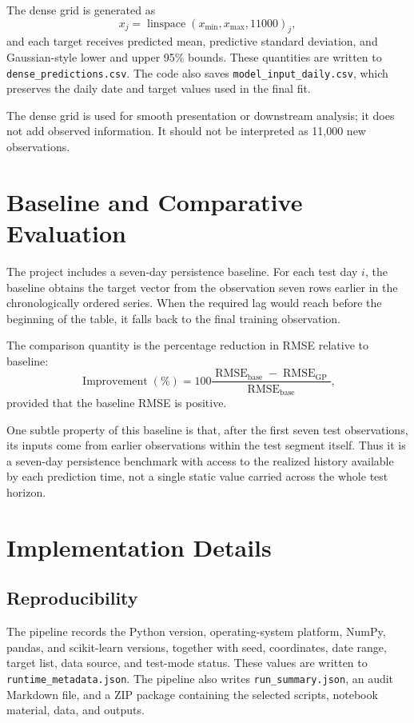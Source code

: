 \documentclass[11pt,a4paper]{article}
\newcommand{\code}[1]{\texttt{#1}}
\begin{document}
The dense grid is generated as
\begin{equation}
 x_j = \operatorname{linspace}(x_{\min},x_{\max},11000)_j,
\end{equation}
and each target receives predicted mean, predictive standard deviation, and Gaussian-style lower and upper 95\% bounds. These quantities are written to \code{dense\_predictions.csv}. The code also saves \code{model\_input\_daily.csv}, which preserves the daily date and target values used in the final fit.

The dense grid is used for smooth presentation or downstream analysis; it does not add observed information. It should not be interpreted as 11,000 new observations.

\section{Baseline and Comparative Evaluation}
The project includes a seven-day persistence baseline. For each test day $i$, the baseline obtains the target vector from the observation seven rows earlier in the chronologically ordered series. When the required lag would reach before the beginning of the table, it falls back to the final training observation.

The comparison quantity is the percentage reduction in RMSE relative to baseline:
\begin{equation}
 \operatorname{Improvement}(\%) = 100\frac{\operatorname{RMSE}_{\mathrm{base}}-\operatorname{RMSE}_{\mathrm{GP}}}{\operatorname{RMSE}_{\mathrm{base}}},
\end{equation}
provided that the baseline RMSE is positive.

One subtle property of this baseline is that, after the first seven test observations, its inputs come from earlier observations within the test segment itself. Thus it is a seven-day persistence benchmark with access to the realized history available by each prediction time, not a single static value carried across the whole test horizon.

\section{Implementation Details}
\subsection{Reproducibility}
The pipeline records the Python version, operating-system platform, NumPy, pandas, and scikit-learn versions, together with seed, coordinates, date range, target list, data source, and test-mode status. These values are written to \code{runtime\_metadata.json}. The pipeline also writes \code{run\_summary.json}, an audit Markdown file, and a ZIP package containing the selected scripts, notebook material, data, and outputs.
\end{document}
